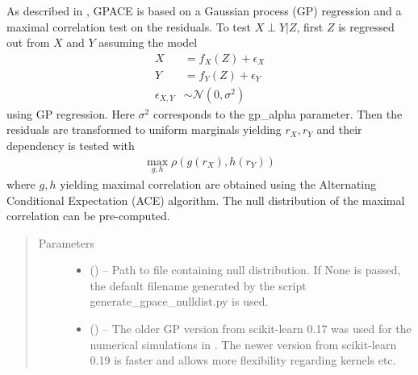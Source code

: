 \documentclass[letterpaper,10pt,english]{sphinxmanual}
\begin{document}
\begin{fulllineitems}
As described in \sphinxfootnotemark[1], GPACE is based on a Gaussian
process (GP) regression and a maximal correlation test on the residuals. To
test \(X \perp Y | Z\), first  \(Z\) is regressed out from \(X\)
and \(Y\) assuming the  model
\begin{equation*}
\begin{split}X & =  f_X(Z) + \epsilon_{X} \\
Y & =  f_Y(Z) + \epsilon_{Y}  \\
\epsilon_{X,Y} &\sim \mathcal{N}(0, \sigma^2)\end{split}
\end{equation*}
using GP regression. Here \(\sigma^2\) corresponds to the gp\_alpha
parameter. Then the residuals  are transformed to uniform
marginals yielding \(r_X,r_Y\) and their dependency is tested with
\begin{equation*}
\begin{split}\max_{g,h}\rho\left(g(r_X),h(r_Y)\right)\end{split}
\end{equation*}
where \(g,h\) yielding maximal correlation are obtained using the
Alternating Conditional Expectation (ACE) algorithm. The null distribution
of the maximal correlation can be pre-computed.
\begin{quote}\begin{description}
\item[{Parameters}] \leavevmode\begin{itemize}
\item {} 
 (\sphinxstyleliteralemphasis{, }\sphinxstyleliteralemphasis{ (}\sphinxstyleliteralemphasis{)}\sphinxstyleliteralemphasis{}) -- Path to file containing null distribution. If None is passed, the
default filename generated by the script \sphinxquotedblleft{}generate\_gpace\_nulldist.py\sphinxquotedblright{}
is used.

\item {} 
 (\sphinxstyleliteralemphasis{, }\sphinxstyleliteralemphasis{, }\sphinxstyleliteralemphasis{ (}\sphinxstyleliteralemphasis{)}\sphinxstyleliteralemphasis{}) -- The older GP version from scikit-learn 0.17 was used for the numerical
simulations in \sphinxfootnotemark[1]. The newer version from scikit-learn 0.19 is faster
and allows more flexibility regarding kernels etc.


\end{itemize}
\end{description}
\end{quote}
\end{fulllineitems}
\end{document}

